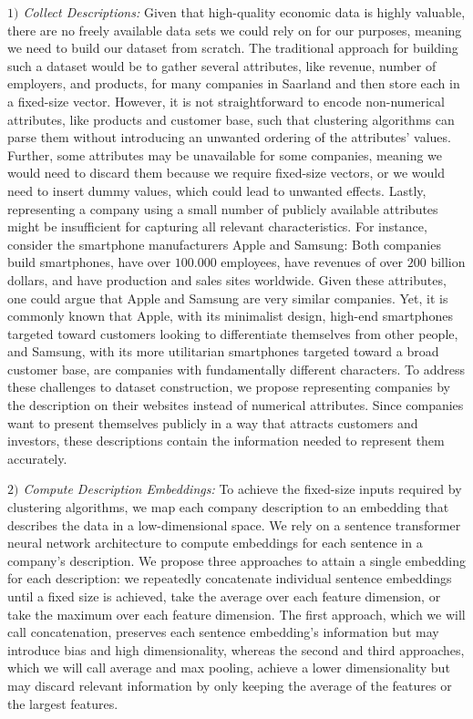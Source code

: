 \documentclass[conference]{IEEEtran}
\newcommand{\pe}[1]{\todo[inline, backgroundcolor=green]{PE: #1}}
\begin{document}
\textit{$1)$ Collect Descriptions:} Given that high-quality economic data is highly valuable, there are no freely available data sets we could rely on for our purposes, meaning we need to build our dataset from scratch. \pe{TODO: rephrase} The traditional approach for building such a dataset would be to gather several attributes, like revenue, number of employers, and products, for many companies in Saarland and then store each in a fixed-size vector. \pe{TODO: backup with accepted approach} However, it is not straightforward to encode non-numerical attributes, like products and customer base, such that clustering algorithms can parse them without introducing an unwanted ordering of the attributes' values. 
Further, some attributes may be unavailable for some companies, meaning we would need to discard them because we require fixed-size vectors, or we would need to insert dummy values, which could lead to unwanted effects.
Lastly, representing a company using a small number of publicly available attributes might be insufficient for capturing all relevant characteristics. For instance, consider the smartphone manufacturers Apple and Samsung: Both companies build smartphones, have over $100.000$ employees, have revenues of over $200$ billion dollars, and have production and sales sites worldwide. Given these attributes, one could argue that Apple and Samsung are very similar companies. Yet, it is commonly known that Apple, with its minimalist design, high-end smartphones targeted toward customers looking to differentiate themselves from other people, and Samsung, with its more utilitarian smartphones targeted toward a broad customer base, are companies with fundamentally different characters.
To address these challenges to dataset construction, we propose representing companies by the description on their websites instead of numerical attributes. Since companies want to present themselves publicly in a way that attracts customers and investors, these descriptions contain the information needed to represent them accurately. 

\textit{$2)$ Compute Description Embeddings:} To achieve the fixed-size inputs required by clustering algorithms, we map each company description to an embedding that describes the data in a low-dimensional space. We rely on a sentence transformer neural network architecture to compute embeddings for each sentence in a company's description. We propose three approaches to attain a single embedding for each description: we repeatedly concatenate individual sentence embeddings until a fixed size is achieved, take the average over each feature dimension, or take the maximum over each feature dimension. The first approach, which we will call concatenation, preserves each sentence embedding's information but may introduce bias and high dimensionality, whereas the second and third approaches, which we will call average and max pooling, achieve a lower dimensionality but may discard relevant information by only keeping the average of the features or the largest features.
\end{document}
